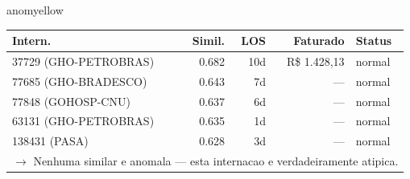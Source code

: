 \documentclass[a4paper,10pt]{article}
\begin{document}
\begin{anomalycard}[Internacao 14624 | GHO-PETROBRAS | MODERADO (z=2.05)]{anomyellow}
\begin{tabular}{l r r r l}\toprule\textbf{Intern.} & \textbf{Simil.} & \textbf{LOS} & \textbf{Faturado} & \textbf{Status} \\\midrule
37729 (GHO-PETROBRAS) & 0.682 & 10d & R\$ 1.428,13 & \textcolor{jcubeblue}{normal} \\
77685 (GHO-BRADESCO) & 0.643 & 7d & --- & \textcolor{jcubeblue}{normal} \\
77848 (GOHOSP-CNU) & 0.637 & 6d & --- & \textcolor{jcubeblue}{normal} \\
63131 (GHO-PETROBRAS) & 0.635 & 1d & --- & \textcolor{jcubeblue}{normal} \\
138431 (PASA) & 0.628 & 3d & --- & \textcolor{jcubeblue}{normal} \\
\multicolumn{5}{l}{\textcolor{jcubeblue}{\small $\rightarrow$ Nenhuma similar e anomala --- esta internacao e verdadeiramente atipica.}} \\
\bottomrule\end{tabular}


\end{anomalycard}

\newpage
\end{document}
